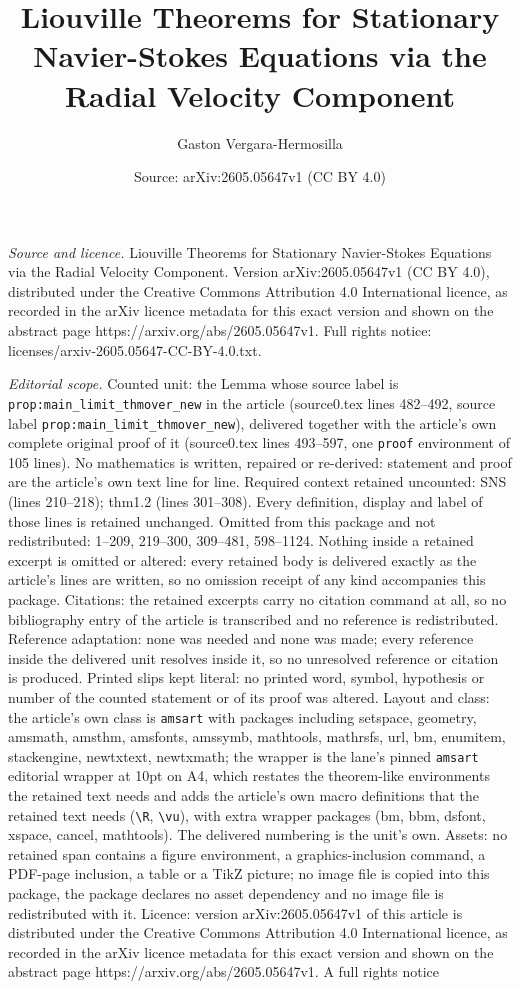 \documentclass[10pt,a4paper]{amsart}
\title[Liouville Theorems for Stationary Navier-Stokes Equations vi]{Liouville Theorems for Stationary Navier-Stokes Equations via the Radial Velocity Component}
\author{Gaston Vergara-Hermosilla}
\date{Source: arXiv:2605.05647v1 (CC BY 4.0)}
\begin{document}
\maketitle

\noindent\emph{Source and licence.} Liouville Theorems for Stationary Navier-Stokes Equations via the Radial Velocity Component. Version arXiv:2605.05647v1 (CC BY 4.0), distributed under the Creative Commons Attribution 4.0 International licence, as recorded in the arXiv licence metadata for this exact version and shown on the abstract page https://arxiv.org/abs/2605.05647v1. Full rights notice: licenses/arxiv-2605.05647-CC-BY-4.0.txt.\par\smallskip

\noindent\textit{Editorial scope.} Counted unit: the Lemma whose source label is \texttt{prop:main\_limit\_thmover\_new} in the article (source0.tex lines 482--492, source label \texttt{prop:main\_limit\_thmover\_new}), delivered together with the article's own complete original proof of it (source0.tex lines 493--597, one \texttt{proof} environment of 105 lines). No mathematics is written, repaired or re-derived: statement and proof are the article's own text line for line. Required context retained uncounted: SNS (lines 210--218); thm1.2 (lines 301--308). Every definition, display and label of those lines is retained unchanged. Omitted from this package and not redistributed: 1--209, 219--300, 309--481, 598--1124. Nothing inside a retained excerpt is omitted or altered: every retained body is delivered exactly as the article's lines are written, so no omission receipt of any kind accompanies this package. Citations: the retained excerpts carry no citation command at all, so no bibliography entry of the article is transcribed and no reference is redistributed. Reference adaptation: none was needed and none was made; every reference inside the delivered unit resolves inside it, so no unresolved reference or citation is produced. Printed slips kept literal: no printed word, symbol, hypothesis or number of the counted statement or of its proof was altered. Layout and class: the article's own class is \texttt{amsart} with packages including setspace, geometry, amsmath, amsthm, amsfonts, amssymb, mathtools, mathrsfs, url, bm, enumitem, stackengine, newtxtext, newtxmath; the wrapper is the lane's pinned \texttt{amsart} editorial wrapper at 10pt on A4, which restates the theorem-like environments the retained text needs and adds the article's own macro definitions that the retained text needs (\texttt{\textbackslash R}, \texttt{\textbackslash vu}), with extra wrapper packages (bm, bbm, dsfont, xspace, cancel, mathtools). The delivered numbering is the unit's own. Assets: no retained span contains a figure environment, a graphics-inclusion command, a PDF-page inclusion, a table or a TikZ picture; no image file is copied into this package, the package declares no asset dependency and no image file is redistributed with it. Licence: version arXiv:2605.05647v1 of this article is distributed under the Creative Commons Attribution 4.0 International licence, as recorded in the arXiv licence metadata for this exact version and shown on the abstract page https://arxiv.org/abs/2605.05647v1. A full rights notice 
\end{document}
